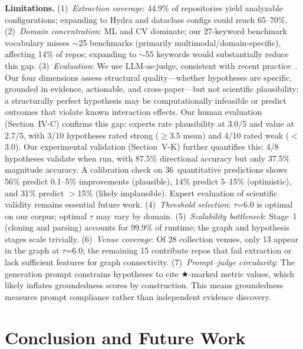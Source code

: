 \documentclass[conference]{IEEEtran}
\begin{document}
\textbf{Limitations.}
(1)~\emph{Extraction coverage}: 44.9\% of repositories yield analyzable configurations; expanding to Hydra and dataclass configs could reach 65--70\%.
(2)~\emph{Domain concentration}: ML and CV dominate; our 27-keyword benchmark vocabulary misses ${\sim}$25 benchmarks (primarily multimodal/domain-specific), affecting 14\% of repos; expanding to ${\sim}$55 keywords would substantially reduce this gap.
(3)~\emph{Evaluation}: We use LLM-as-judge, consistent with recent practice~\cite{si2024llmideas, lu2024aiscientist}.
Our four dimensions assess structural quality---whether hypotheses are specific, grounded in evidence, actionable, and cross-paper---but not scientific plausibility: a structurally perfect hypothesis may be computationally infeasible or predict outcomes that violate known interaction effects.
Our human evaluation (Section~IV-C) confirms this gap: experts rate plausibility at 3.0/5 and value at 2.7/5, with 3/10 hypotheses rated strong ($\geq$3.5 mean) and 4/10 rated weak ($<$3.0).
Our experimental validation (Section~V-K) further quantifies this: 4/8 hypotheses validate when run, with 87.5\% directional accuracy but only 37.5\% magnitude accuracy.
A calibration check on 36~quantitative predictions shows 56\% predict 0.1--5\% improvements (plausible), 14\% predict 5--15\% (optimistic), and 31\% predict $>$15\% (likely implausible).
Expert evaluation of scientific validity remains essential future work.
(4)~\emph{Threshold selection}: $\tau$=6.0 is optimal on our corpus; optimal $\tau$ may vary by domain.
(5)~\emph{Scalability bottleneck}: Stage~1 (cloning and parsing) accounts for 99.9\% of runtime; the graph and hypothesis stages scale trivially.
(6)~\emph{Venue coverage}: Of 28 collection venues, only 13 appear in the graph at $\tau$=6.0; the remaining 15 contribute repos that fail extraction or lack sufficient features for graph connectivity.
(7)~\emph{Prompt--judge circularity}: The generation prompt constrains hypotheses to cite $\bigstar$-marked metric values, which likely inflates groundedness scores by construction. This means groundedness measures prompt compliance rather than independent evidence discovery.


\section{Conclusion and Future Work}
\end{document}
